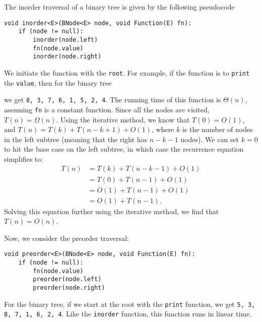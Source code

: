 \documentclass[a4paper, openany]{memoir}
\begin{document}
\noindent The inorder traversal of a binary tree is given by the following pseudocode
\begin{lstlisting}[language=pseudocode]
void inorder<E>(BNode<E> node, void Function(E) fn):
    if (node != null):
        inorder(node.left)
        fn(node.value)
        inorder(node.right)
\end{lstlisting}
We initiate the function with the \texttt{root}. For example, if the function is to \texttt{print} the \texttt{value}, then for the binary tree 
\begin{center}
\end{center}
we get \texttt{8, 3, 7, 6, 1, 5, 2, 4}. The running time of this function is $\Theta(n)$, assuming \texttt{fn} is a constant function. Since all the nodes are visited, $T(n) = \Omega(n)$. Using the iterative method, we know that $T(0) = O(1)$, and $T(n) = T(k) + T(n-k+1)+O(1)$, where $k$ is the number of nodes in the left subtree (meaning that the right has $n-k-1$ nodes). We can set $k = 0$ to hit the base case on the left subtree, in which case the recurrence equation simplifies to:
\begin{align*}
    T(n) &= T(k) + T(n-k-1) + O(1) \\
    &= T(0) + T(n-1) + O(1) \\
    &= O(1) + T(n-1) + O(1) \\
    &= O(1) + T(n-1).
\end{align*}
Solving this equation further using the iterative method, we find that $T(n) = O(n)$.

\noindent Now, we consider the preorder traversal:
\begin{lstlisting}[language=pseudocode]
void preorder<E>(BNode<E> node, void Function(E) fn):
    if (node != null):
        fn(node.value)
        preorder(node.left)
        preorder(node.right)
\end{lstlisting}
For the binary tree, if we start at the root with the \texttt{print} function, we get \texttt{5, 3, 8, 7, 1, 6, 2, 4}. Like the \texttt{inorder} function, this function runs in linear time.
\end{document}
